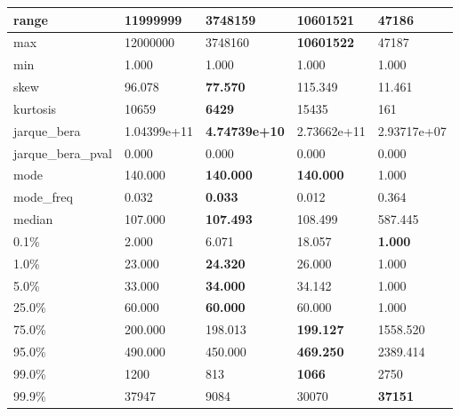 \begin{table}[H]
\begin{tabular}{|l|m{10em}|m{10em}|m{10em}|m{10em}|}
\hline range & 11999999 & 3748159 & \bfseries 10601521 & \cellcolor[rgb]{0.9, 0.54, 0.52} 47186 \\
\hline max & 12000000 & 3748160 & \bfseries 10601522 & \cellcolor[rgb]{0.9, 0.54, 0.52} 47187 \\
\hline min & 1.000 & 1.000 & 1.000 & 1.000 \\
\hline skew & 96.078 & \bfseries 77.570 & 115.349 & \cellcolor[rgb]{0.9, 0.54, 0.52} 11.461 \\
\hline kurtosis & 10659 & \bfseries 6429 & 15435 & \cellcolor[rgb]{0.9, 0.54, 0.52} 161 \\
\hline jarque\_bera & 1.04399e+11 & \bfseries 4.74739e+10 & \cellcolor[rgb]{0.9, 0.54, 0.52} 2.73662e+11 & 2.93717e+07 \\
\hline jarque\_bera\_pval & 0.000 & 0.000 & 0.000 & 0.000 \\
\hline mode & 140.000 & \bfseries 140.000 & \bfseries 140.000 & \cellcolor[rgb]{0.9, 0.54, 0.52} 1.000 \\
\hline mode\_freq & 0.032 & \bfseries 0.033 & 0.012 & \cellcolor[rgb]{0.9, 0.54, 0.52} 0.364 \\
\hline median & 107.000 & \bfseries 107.493 & 108.499 & \cellcolor[rgb]{0.9, 0.54, 0.52} 587.445 \\
\hline 0.1\% & 2.000 & 6.071 & \cellcolor[rgb]{0.9, 0.54, 0.52} 18.057 & \bfseries 1.000 \\
\hline 1.0\% & 23.000 & \bfseries 24.320 & 26.000 & \cellcolor[rgb]{0.9, 0.54, 0.52} 1.000 \\
\hline 5.0\% & 33.000 & \bfseries 34.000 & 34.142 & \cellcolor[rgb]{0.9, 0.54, 0.52} 1.000 \\
\hline 25.0\% & 60.000 & \bfseries 60.000 & 60.000 & \cellcolor[rgb]{0.9, 0.54, 0.52} 1.000 \\
\hline 75.0\% & 200.000 & 198.013 & \bfseries 199.127 & \cellcolor[rgb]{0.9, 0.54, 0.52} 1558.520 \\
\hline 95.0\% & 490.000 & 450.000 & \bfseries 469.250 & \cellcolor[rgb]{0.9, 0.54, 0.52} 2389.414 \\
\hline 99.0\% & 1200 & 813 & \bfseries 1066 & \cellcolor[rgb]{0.9, 0.54, 0.52} 2750 \\
\hline 99.9\% & 37947 & \cellcolor[rgb]{0.9, 0.54, 0.52} 9084 & 30070 & \bfseries 37151 \\
\hline
\end{tabular}
\end{table}
